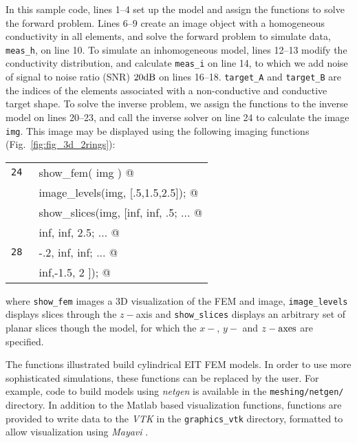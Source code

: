 \documentclass[12pt]{iopart}
\makeatletter
\newcommand{\CODEstart}{\medskip\begin{tabular}{ll}}
\newcommand{\CN}{\tt\scriptsize} %
\newcommand{\CC}{&\small\verb@}   % start code
\newcommand{\CODEend}{\end{tabular}\medskip}
\makeatother
\begin{document}
In this sample code, lines 1--4 set up the model and assign
the functions to solve the forward problem.
Lines 6--9 create an image object with a homogeneous
conductivity in all elements, and solve the forward
problem to simulate data, {\tt meas\_h}, on line 10. To simulate an
inhomogeneous model, lines 12--13 modify the conductivity
distribution, and calculate {\tt meas\_i} on line 14,
to which we add noise of signal to noise ratio (SNR) $20\rm dB$
on lines 16--18.
{\tt target\_A} and {\tt target\_B} are the indices of the 
elements associated with a non-conductive and conductive
target shape.
To solve the inverse problem, we assign the functions to
the inverse model on lines 20--23, and call the inverse solver
on line 24 to calculate the image {\tt img}. This image
may be displayed using the following imaging functions
(Fig.~\ref{fig:fig_3d_2rings}):

\CODEstart
\CN 24 \CC show_fem( img ) @\\[-3pt]
\CN    \CC image_levels(img, [.5,1.5,2.5]); @\\[-3pt]
\CN    \CC show_slices(img, [inf, inf, .5; ... @\\[-3pt]
\CN    \CC                   inf, inf, 2.5; ... @\\[-3pt]
\CN 28 \CC                   -.2, inf, inf; ... @\\[-3pt]
\CN    \CC                   inf,-1.5,   2 ]); @\\[-3pt]
\CODEend

\noindent
where {\tt show\_fem} images a 3D visualization of the
FEM and image, {\tt image\_levels} displays slices through
the $z-$axis and {\tt show\_slices} displays an
arbitrary set of planar slices though the model, for which the
$x-$, $y-$ and $z-\rm axes$ are specified.

The functions illustrated
build cylindrical EIT FEM models. In order to use more
sophisticated simulations, these functions can be replaced
by the user. For example, code to build models using {\em netgen}
\cite{Schoberl_1997}  is available in the
{\tt meshing/netgen/} directory.
In addition to the Matlab based visualization functions,
functions are provided to write data to the {\em VTK}
in the {\tt graphics\_vtk} directory,
formatted to allow visualization using {\em Mayavi}
\cite{Ramachandran_2003}.
\end{document}
